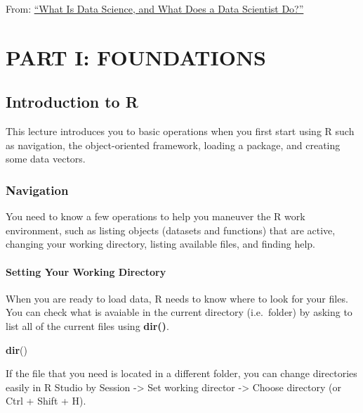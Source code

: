 \documentclass[]{book}
\newenvironment{Shaded}{\begin{snugshade}}{\end{snugshade}}
\newcommand{\KeywordTok}[1]{\textcolor[rgb]{0.13,0.29,0.53}{\textbf{#1}}}
\newcommand{\NormalTok}[1]{#1}
\theoremstyle{definition}
\theoremstyle{definition}
\theoremstyle{definition}
\theoremstyle{remark}
\begin{document}
From:
\href{https://www.innoarchitech.com/what-is-data-science-does-data-scientist-do/}{``What
Is Data Science, and What Does a Data Scientist Do?''}

\hypertarget{part-part-i-foundations}{%
\part{PART I: FOUNDATIONS}\label{part-part-i-foundations}}

\hypertarget{introduction-to-r}{%
\chapter{Introduction to R}\label{introduction-to-r}}

This lecture introduces you to basic operations when you first start
using R such as navigation, the object-oriented framework, loading a
package, and creating some data vectors.

\hypertarget{navigation}{%
\section{Navigation}\label{navigation}}

You need to know a few operations to help you maneuver the R work
environment, such as listing objects (datasets and functions) that are
active, changing your working directory, listing available files, and
finding help.

\hypertarget{setting-your-working-directory}{%
\subsection{Setting Your Working
Directory}\label{setting-your-working-directory}}

When you are ready to load data, R needs to know where to look for your
files. You can check what is avaiable in the current directory
(i.e.~folder) by asking to list all of the current files using
\textbf{dir()}.

\begin{Shaded}
\begin{Highlighting}[]
\KeywordTok{dir}\NormalTok{()}
\end{Highlighting}
\end{Shaded}

If the file that you need is located in a different folder, you can
change directories easily in R Studio by Session -\textgreater{} Set
working director -\textgreater{} Choose directory (or Ctrl + Shift + H).
\end{document}

